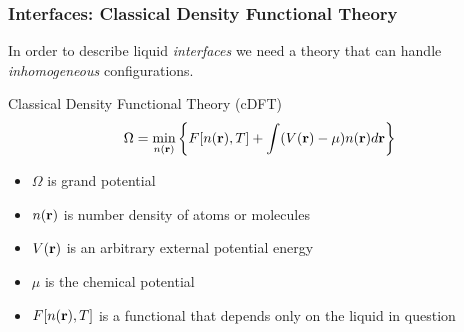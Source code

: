 \begin{frame}
  \frametitle{Interfaces:  Classical Density Functional Theory}
  In order to describe liquid \emph{interfaces} we need a theory that
  can handle \emph{inhomogeneous} configurations.
  \begin{block}{Classical Density Functional Theory (cDFT)}
    \[\Omega = \min_{n(\mathbf{r})} \left\{ F[n(\mathbf{r}), T] + \int (V(\mathbf{r})-\mu) n(\mathbf{r})d\mathbf{r} \right\}
    \]
    \begin{itemize}
    \item $\Omega$ is grand potential
    \item $n(\mathbf{r})$ is number density of atoms or molecules
    \item $V(\mathbf{r})$ is an arbitrary external potential energy
    \item $\mu$ is the chemical potential
    \item $F[n(\mathbf{r}),T]$ is a functional that depends only on the
      liquid in question
    \end{itemize}
  \end{block}
\end{frame}
